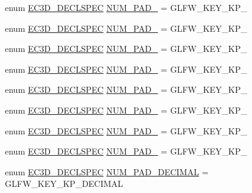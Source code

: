 \begin{DoxyCompactItemize}
enum \mbox{\hyperlink{_common_8h_aac42573e202ca3dd4d259c81691e2369}{E\+C3\+D\+\_\+\+D\+E\+C\+L\+S\+P\+EC}} \mbox{\hyperlink{classec_1_1_keyboard_a456fc67954c8173aeb9450d10b3b1d3c}{N\+U\+M\+\_\+\+P\+A\+D\+\_}} = G\+L\+F\+W\+\_\+\+K\+E\+Y\+\_\+\+K\+P\+\_
\item 
enum \mbox{\hyperlink{_common_8h_aac42573e202ca3dd4d259c81691e2369}{E\+C3\+D\+\_\+\+D\+E\+C\+L\+S\+P\+EC}} \mbox{\hyperlink{classec_1_1_keyboard_abd3ad06b0229df388156efe666662908}{N\+U\+M\+\_\+\+P\+A\+D\+\_}} = G\+L\+F\+W\+\_\+\+K\+E\+Y\+\_\+\+K\+P\+\_
\item 
enum \mbox{\hyperlink{_common_8h_aac42573e202ca3dd4d259c81691e2369}{E\+C3\+D\+\_\+\+D\+E\+C\+L\+S\+P\+EC}} \mbox{\hyperlink{classec_1_1_keyboard_a2fa7355ac90ada75403e6964ef373a7d}{N\+U\+M\+\_\+\+P\+A\+D\+\_}} = G\+L\+F\+W\+\_\+\+K\+E\+Y\+\_\+\+K\+P\+\_
\item 
enum \mbox{\hyperlink{_common_8h_aac42573e202ca3dd4d259c81691e2369}{E\+C3\+D\+\_\+\+D\+E\+C\+L\+S\+P\+EC}} \mbox{\hyperlink{classec_1_1_keyboard_ab1fe2bc49a3287ac92b32006dfc046c8}{N\+U\+M\+\_\+\+P\+A\+D\+\_}} = G\+L\+F\+W\+\_\+\+K\+E\+Y\+\_\+\+K\+P\+\_
\item 
enum \mbox{\hyperlink{_common_8h_aac42573e202ca3dd4d259c81691e2369}{E\+C3\+D\+\_\+\+D\+E\+C\+L\+S\+P\+EC}} \mbox{\hyperlink{classec_1_1_keyboard_ac06ec74ae84452fda7be4ea0c69738b2}{N\+U\+M\+\_\+\+P\+A\+D\+\_}} = G\+L\+F\+W\+\_\+\+K\+E\+Y\+\_\+\+K\+P\+\_
\item 
enum \mbox{\hyperlink{_common_8h_aac42573e202ca3dd4d259c81691e2369}{E\+C3\+D\+\_\+\+D\+E\+C\+L\+S\+P\+EC}} \mbox{\hyperlink{classec_1_1_keyboard_aaaca0509bb330fc1402064d32cc85b9e}{N\+U\+M\+\_\+\+P\+A\+D\+\_}} = G\+L\+F\+W\+\_\+\+K\+E\+Y\+\_\+\+K\+P\+\_
\item 
enum \mbox{\hyperlink{_common_8h_aac42573e202ca3dd4d259c81691e2369}{E\+C3\+D\+\_\+\+D\+E\+C\+L\+S\+P\+EC}} \mbox{\hyperlink{classec_1_1_keyboard_a853e5fefb7cf1d53efcf268504118325}{N\+U\+M\+\_\+\+P\+A\+D\+\_}} = G\+L\+F\+W\+\_\+\+K\+E\+Y\+\_\+\+K\+P\+\_
\item 
enum \mbox{\hyperlink{_common_8h_aac42573e202ca3dd4d259c81691e2369}{E\+C3\+D\+\_\+\+D\+E\+C\+L\+S\+P\+EC}} \mbox{\hyperlink{classec_1_1_keyboard_ad2a8888dce13abd7a8ebadf78978262d}{N\+U\+M\+\_\+\+P\+A\+D\+\_}} = G\+L\+F\+W\+\_\+\+K\+E\+Y\+\_\+\+K\+P\+\_
\item 
enum \mbox{\hyperlink{_common_8h_aac42573e202ca3dd4d259c81691e2369}{E\+C3\+D\+\_\+\+D\+E\+C\+L\+S\+P\+EC}} \mbox{\hyperlink{classec_1_1_keyboard_a7fb474a14a119bb7f51b05aa38db37d8}{N\+U\+M\+\_\+\+P\+A\+D\+\_\+\+D\+E\+C\+I\+M\+AL}} = G\+L\+F\+W\+\_\+\+K\+E\+Y\+\_\+\+K\+P\+\_\+\+D\+E\+C\+I\+M\+AL

\end{DoxyCompactItemize}
